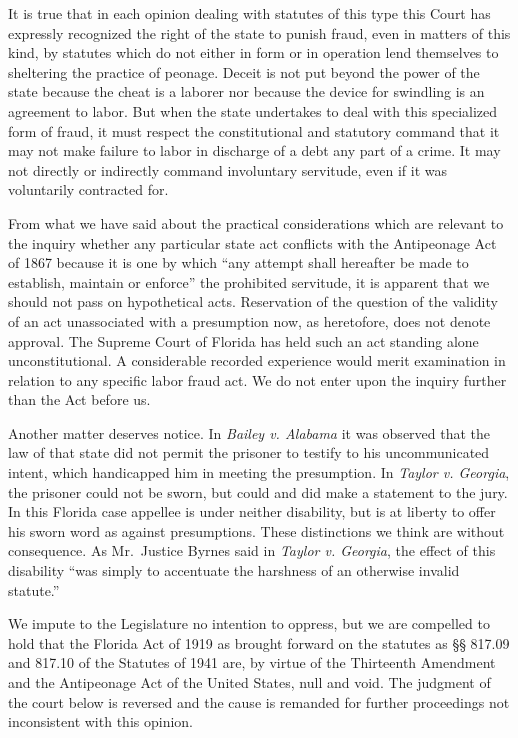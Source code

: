 \documentclass[
  letterpaper,
  11pt,
  DIV=9,
  openright]{scrbook}
\begin{document}
It is true that in each opinion dealing with statutes of this type this
Court has expressly recognized the right of the state to punish fraud,
even in matters of this kind, by statutes which do not either in form or
in operation lend themselves to sheltering the practice of peonage.
Deceit is not put beyond the power of the state because the cheat is a
laborer nor because the device for swindling is an agreement to labor.
But when the state undertakes to deal with this specialized form of
fraud, it must respect the constitutional and statutory command that it
may not make failure to labor in discharge of a debt any part of a
crime. It may not directly or indirectly command involuntary servitude,
even if it was voluntarily contracted for.

From what we have said about the practical considerations which are
relevant to the inquiry whether any particular state act conflicts with
the Antipeonage Act of 1867 because it is one by which ``any attempt
shall hereafter be made to establish, maintain or enforce'' the
prohibited servitude, it is apparent that we should not pass on
hypothetical acts. Reservation of the question of the validity of an act
unassociated with a presumption now, as heretofore, does not denote
approval. The Supreme Court of Florida has held such an act standing
alone unconstitutional. A considerable recorded experience would merit
examination in relation to any specific labor fraud act. We do not enter
upon the inquiry further than the Act before us.

Another matter deserves notice. In \emph{Bailey v. Alabama} it was
observed that the law of that state did not permit the prisoner to
testify to his uncommunicated intent, which handicapped him in meeting
the presumption. In \emph{Taylor v. Georgia}, the prisoner could not be
sworn, but could and did make a statement to the jury. In this Florida
case appellee is under neither disability, but is at liberty to offer
his sworn word as against presumptions. These distinctions we think are
without consequence. As Mr.~Justice Byrnes said in \emph{Taylor v.
Georgia}, the effect of this disability ``was simply to accentuate the
harshness of an otherwise invalid statute.''

We impute to the Legislature no intention to oppress, but we are
compelled to hold that the Florida Act of 1919 as brought forward on the
statutes as §§ 817.09 and 817.10 of the Statutes of 1941 are, by virtue
of the Thirteenth Amendment and the Antipeonage Act of the United
States, null and void. The judgment of the court below is reversed and
the cause is remanded for further proceedings not inconsistent with this
opinion.
\end{document}
